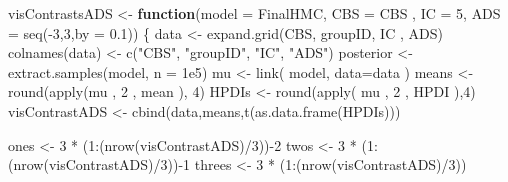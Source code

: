 \documentclass[
  10pt,
  dvipsnames,enabledeprecatedfontcommands]{scrartcl}
\newenvironment{Shaded}{\begin{snugshade}}{\end{snugshade}}
\newcommand{\AttributeTok}[1]{\textcolor[rgb]{0.77,0.63,0.00}{#1}}
\newcommand{\ControlFlowTok}[1]{\textcolor[rgb]{0.13,0.29,0.53}{\textbf{#1}}}
\newcommand{\DecValTok}[1]{\textcolor[rgb]{0.00,0.00,0.81}{#1}}
\newcommand{\FloatTok}[1]{\textcolor[rgb]{0.00,0.00,0.81}{#1}}
\newcommand{\FunctionTok}[1]{\textcolor[rgb]{0.00,0.00,0.00}{#1}}
\newcommand{\NormalTok}[1]{#1}
\newcommand{\OtherTok}[1]{\textcolor[rgb]{0.56,0.35,0.01}{#1}}
\newcommand{\SpecialCharTok}[1]{\textcolor[rgb]{0.00,0.00,0.00}{#1}}
\newcommand{\StringTok}[1]{\textcolor[rgb]{0.31,0.60,0.02}{#1}}
\begin{document}
\begin{Shaded}
\begin{Highlighting}[]
\NormalTok{visContrastsADS }\OtherTok{\textless{}{-}} \ControlFlowTok{function}\NormalTok{(}\AttributeTok{model =}\NormalTok{ FinalHMC, }\AttributeTok{CBS =}\NormalTok{ CBS , }\AttributeTok{IC =}  \DecValTok{5}\NormalTok{, }
                            \AttributeTok{ADS =} \FunctionTok{seq}\NormalTok{(}\SpecialCharTok{{-}}\DecValTok{3}\NormalTok{,}\DecValTok{3}\NormalTok{,}\AttributeTok{by  =} \FloatTok{0.1}\NormalTok{))}
\NormalTok{\{}
\NormalTok{  data }\OtherTok{\textless{}{-}} \FunctionTok{expand.grid}\NormalTok{(CBS, groupID, IC , ADS)}
  \FunctionTok{colnames}\NormalTok{(data) }\OtherTok{\textless{}{-}} \FunctionTok{c}\NormalTok{(}\StringTok{"CBS"}\NormalTok{, }\StringTok{"groupID"}\NormalTok{, }\StringTok{"IC"}\NormalTok{, }\StringTok{"ADS"}\NormalTok{)}
\NormalTok{  posterior }\OtherTok{\textless{}{-}} \FunctionTok{extract.samples}\NormalTok{(model, }\AttributeTok{n =} \FloatTok{1e5}\NormalTok{)}
\NormalTok{  mu }\OtherTok{\textless{}{-}} \FunctionTok{link}\NormalTok{( model, }\AttributeTok{data=}\NormalTok{data ) }
\NormalTok{  means }\OtherTok{\textless{}{-}}  \FunctionTok{round}\NormalTok{(}\FunctionTok{apply}\NormalTok{(mu , }\DecValTok{2}\NormalTok{ , mean ), }\DecValTok{4}\NormalTok{)}
\NormalTok{  HPDIs }\OtherTok{\textless{}{-}} \FunctionTok{round}\NormalTok{(}\FunctionTok{apply}\NormalTok{( mu , }\DecValTok{2}\NormalTok{ , HPDI ),}\DecValTok{4}\NormalTok{)}
\NormalTok{  visContrastADS }\OtherTok{\textless{}{-}} \FunctionTok{cbind}\NormalTok{(data,means,}\FunctionTok{t}\NormalTok{(}\FunctionTok{as.data.frame}\NormalTok{(HPDIs)))}


\NormalTok{  ones }\OtherTok{\textless{}{-}} \DecValTok{3} \SpecialCharTok{*}\NormalTok{ (}\DecValTok{1}\SpecialCharTok{:}\NormalTok{(}\FunctionTok{nrow}\NormalTok{(visContrastADS)}\SpecialCharTok{/}\DecValTok{3}\NormalTok{))}\SpecialCharTok{{-}}\DecValTok{2}
\NormalTok{  twos }\OtherTok{\textless{}{-}} \DecValTok{3} \SpecialCharTok{*}\NormalTok{ (}\DecValTok{1}\SpecialCharTok{:}\NormalTok{(}\FunctionTok{nrow}\NormalTok{(visContrastADS)}\SpecialCharTok{/}\DecValTok{3}\NormalTok{))}\SpecialCharTok{{-}}\DecValTok{1}
\NormalTok{  threes }\OtherTok{\textless{}{-}} \DecValTok{3} \SpecialCharTok{*}\NormalTok{ (}\DecValTok{1}\SpecialCharTok{:}\NormalTok{(}\FunctionTok{nrow}\NormalTok{(visContrastADS)}\SpecialCharTok{/}\DecValTok{3}\NormalTok{))}
  

\end{Highlighting}
\end{Shaded}
\end{document}
